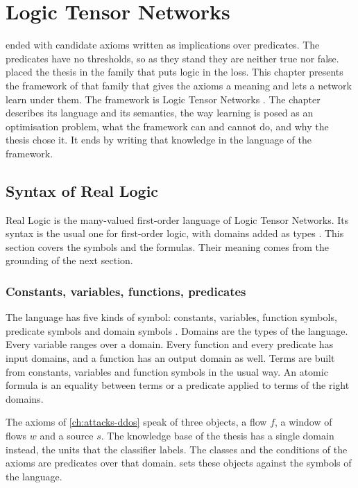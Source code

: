 \chapter{Logic Tensor Networks}
\label{ch:ltn}

 ended with candidate axioms written as implications
over predicates. The predicates have no thresholds, so as they stand they are
neither true nor false.  placed the thesis in the
family that puts logic in the loss. This chapter presents the framework of
that family that gives the axioms a meaning and lets a network learn under
them. The framework is Logic Tensor
Networks \citep{badreddine2022ltn}. The chapter describes its language and its
semantics, the way learning is posed as an optimisation problem, what the
framework can and cannot do, and why the thesis chose it. It ends by writing
that knowledge in the language of the framework.

\section{Syntax of Real Logic}
\label{sec:real-logic-syntax}

Real Logic is the many-valued first-order language of Logic Tensor Networks.
Its syntax is the usual one for first-order logic, with domains added as
types \citep{badreddine2022ltn}. This section covers the symbols and the
formulas. Their meaning comes from the grounding of the next section.

\subsection{Constants, variables, functions, predicates}
\label{sec:rl-symbols}

The language has five kinds of symbol: constants, variables, function symbols,
predicate symbols and domain symbols \citep{badreddine2022ltn}. Domains are
the types of the language. Every variable ranges over a domain. Every function
and every predicate has input domains, and a function has an output domain as
well. Terms are built from constants, variables and function symbols in the
usual way. An atomic formula is an equality between terms or a predicate
applied to terms of the right domains.

The axioms of \cref{ch:attacks-ddos} speak of three objects, a flow $f$, a
window of flows $w$ and a source $s$. The knowledge base of the thesis has a
single domain instead, the units that the classifier labels. The classes and
the conditions of the axioms are predicates over that domain.
 sets these objects against the symbols of the
language.

